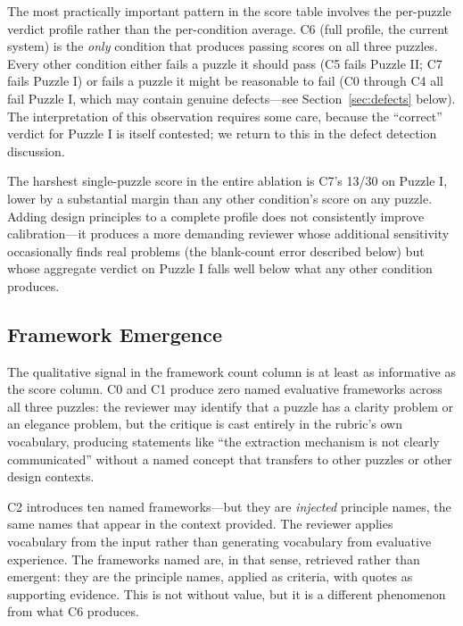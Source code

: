 The most practically important pattern in the score table involves the per-puzzle verdict profile rather than the per-condition average. C6 (full profile, the current system) is the \emph{only} condition that produces passing scores on all three puzzles. Every other condition either fails a puzzle it should pass (C5 fails Puzzle II; C7 fails Puzzle I) or fails a puzzle it might be reasonable to fail (C0 through C4 all fail Puzzle I, which may contain genuine defects---see Section~\ref{sec:defects} below). The interpretation of this observation requires some care, because the ``correct'' verdict for Puzzle I is itself contested; we return to this in the defect detection discussion.

The harshest single-puzzle score in the entire ablation is C7's 13/30 on Puzzle I, lower by a substantial margin than any other condition's score on any puzzle. Adding design principles to a complete profile does not consistently improve calibration---it produces a more demanding reviewer whose additional sensitivity occasionally finds real problems (the blank-count error described below) but whose aggregate verdict on Puzzle I falls well below what any other condition produces.

\subsection{Framework Emergence}
\label{sec:frameworks}

The qualitative signal in the framework count column is at least as informative as the score column. C0 and C1 produce zero named evaluative frameworks across all three puzzles: the reviewer may identify that a puzzle has a clarity problem or an elegance problem, but the critique is cast entirely in the rubric's own vocabulary, producing statements like ``the extraction mechanism is not clearly communicated'' without a named concept that transfers to other puzzles or other design contexts.

C2 introduces ten named frameworks---but they are \emph{injected} principle names, the same names that appear in the context provided. The reviewer applies vocabulary from the input rather than generating vocabulary from evaluative experience. The frameworks named are, in that sense, retrieved rather than emergent: they are the principle names, applied as criteria, with quotes as supporting evidence. This is not without value, but it is a different phenomenon from what C6 produces.


